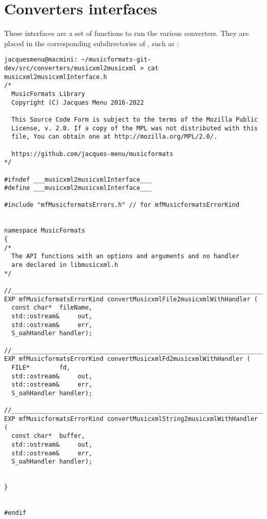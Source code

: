 
\chapter{Converters interfaces}

These interfaces are a set of functions to run the various converters. They are placed in the corresponding subdirectories of \converters, such as :
\begin{lstlisting}[language=Terminal]
jacquesmenu@macmini: ~/musicformats-git-dev/src/converters/musicxml2musicxml > cat musicxml2musicxmlInterface.h
/*
  MusicFormats Library
  Copyright (C) Jacques Menu 2016-2022

  This Source Code Form is subject to the terms of the Mozilla Public
  License, v. 2.0. If a copy of the MPL was not distributed with this
  file, You can obtain one at http://mozilla.org/MPL/2.0/.

  https://github.com/jacques-menu/musicformats
*/

#ifndef ___musicxml2musicxmlInterface___
#define ___musicxml2musicxmlInterface___

#include "mfMusicformatsErrors.h" // for mfMusicformatsErrorKind


namespace MusicFormats
{
/*
  The API functions with an options and arguments and no handler
  are declared in libmusicxml.h
*/

//_______________________________________________________________________________
EXP mfMusicformatsErrorKind convertMusicxmlFile2musicxmlWithHandler (
  const char*  fileName,
  std::ostream&     out,
  std::ostream&     err,
  S_oahHandler handler);

//_______________________________________________________________________________
EXP mfMusicformatsErrorKind convertMusicxmlFd2musicxmlWithHandler (
  FILE*        fd,
  std::ostream&     out,
  std::ostream&     err,
  S_oahHandler handler);

//_______________________________________________________________________________
EXP mfMusicformatsErrorKind convertMusicxmlString2musicxmlWithHandler (
  const char*  buffer,
  std::ostream&     out,
  std::ostream&     err,
  S_oahHandler handler);


}


#endif
\end{lstlisting}


